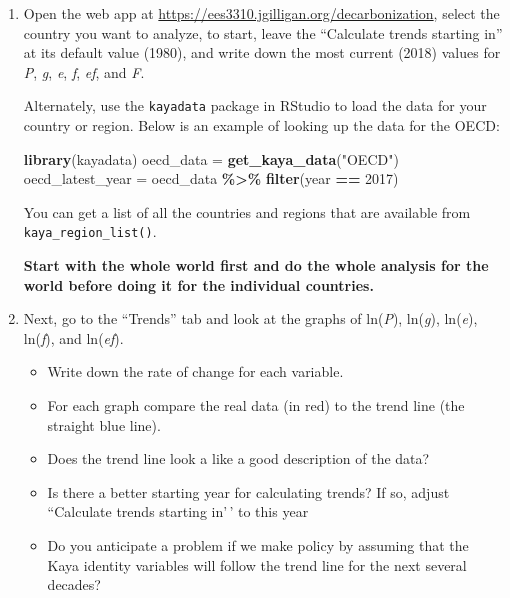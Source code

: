\documentclass[
]{article}
\newenvironment{Shaded}{\begin{snugshade}}{\end{snugshade}}
\newcommand{\DecValTok}[1]{\textcolor[rgb]{0.00,0.00,0.81}{#1}}
\newcommand{\KeywordTok}[1]{\textcolor[rgb]{0.13,0.29,0.53}{\textbf{#1}}}
\newcommand{\NormalTok}[1]{#1}
\newcommand{\OperatorTok}[1]{\textcolor[rgb]{0.81,0.36,0.00}{\textbf{#1}}}
\newcommand{\StringTok}[1]{\textcolor[rgb]{0.31,0.60,0.02}{#1}}
\providecommand{\tightlist}{%
  \setlength{\itemsep}{0pt}\setlength{\parskip}{0pt}}
\begin{document}
\begin{enumerate}
\def\labelenumi{\arabic{enumi}.}
\item
  Open the web app at
  \url{https://ees3310.jgilligan.org/decarbonization}, select the
  country you want to analyze, to start, leave the ``Calculate trends
  starting in'' at its default value (1980), and write down the most
  current (2018) values for \emph{P}, \emph{g}, \emph{e}, \emph{f},
  \emph{ef}, and \emph{F}.

  Alternately, use the \texttt{kayadata} package in RStudio to load the
  data for your country or region. Below is an example of looking up the
  data for the OECD:

\begin{Shaded}
\begin{Highlighting}[]
\KeywordTok{library}\NormalTok{(kayadata)}
\NormalTok{oecd\_data =}\StringTok{ }\KeywordTok{get\_kaya\_data}\NormalTok{(}\StringTok{"OECD"}\NormalTok{)}
\NormalTok{oecd\_latest\_year =}\StringTok{ }\NormalTok{oecd\_data }\OperatorTok{\%>\%}\StringTok{ }\KeywordTok{filter}\NormalTok{(year }\OperatorTok{==}\StringTok{ }\DecValTok{2017}\NormalTok{)}
\end{Highlighting}
\end{Shaded}

  You can get a list of all the countries and regions that are available
  from \texttt{kaya\_region\_list()}.

  \textbf{Start with the whole world first and do the whole analysis for
  the world before doing it for the individual countries.}
\item
  Next, go to the ``Trends'' tab and look at the graphs of ln(\emph{P}),
  ln(\emph{g}), ln(\emph{e}), ln(\emph{f}), and ln(\emph{ef}).

  \begin{itemize}
  \tightlist
  \item
    Write down the rate of change for each variable.
  \item
    For each graph compare the real data (in red) to the trend line (the
    straight blue line).
  \item
    Does the trend line look a like a good description of the data?
  \item
    Is there a better starting year for calculating trends? If so,
    adjust ``Calculate trends starting in'\,' to this year
  \item
    Do you anticipate a problem if we make policy by assuming that the
    Kaya identity variables will follow the trend line for the next
    several decades?
  \end{itemize}


\end{enumerate}
\end{document}
